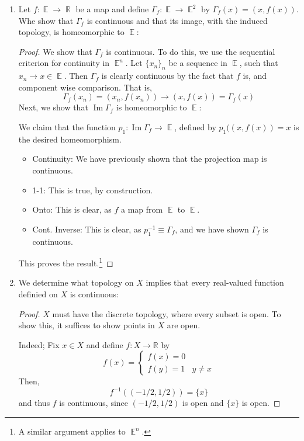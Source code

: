 \documentclass{book}
\DeclareMathOperator*{\R}{\mathbb{R}}
\DeclareMathOperator*{\E}{\mathbb{E}}
\DeclareMathOperator*{\Image}{\text{Im}}
\begin{document}
\begin{enumerate}[(1)]
    \item Let $f: \E \rightarrow \R$ be a map and define $\Gamma_f: \E \rightarrow \E^2$ by $\Gamma_f (x) = (x, f(x))$. Whe show that $\Gamma _f$ is continuous and that its image, with the induced topology, is homeomorphic to $\E$: 
        \begin{proof} We show that $\Gamma_f$ is continuous. To do this, we use the sequential criterion for continuity in $\E^n$. Let $\{x_n\}_n$ be a sequence in $\E$, such that $x_n \rightarrow x \in \E$. Then $\Gamma_f$ is clearly continuous by the fact that $f$ is, and component wise comparison.  That is, 
            \[  \Gamma_f (x_n) = (x_n, f(x_n)) \rightarrow (x, f(x)) = \Gamma_f (x) \]
            Next, we show that $\Image \Gamma_f$ is homeomorphic to $\E$:
            \par We claim that the function $p_1: \Image \Gamma_f \rightarrow \E$, defined by $p_1((x, f(x)) = x$ is the desired homeomorphism. 
            \begin{itemize}
                \item[] Continuity: We have previously shown that the projection map is continuous.
                \item[] 1-1: This is true, by construction. 
                \item[] Onto: This is clear, as $f$ a map from $\E$ to $\E$. 
                \item[] Cont. Inverse: This is clear, as $p_1^{-1} \equiv \Gamma_f$, and we have shown $\Gamma_f$ is continuous. 
            \end{itemize}
            This proves the result.\footnote{A similar argument applies to $\E^n$.} 
        \end{proof}

    \item We determine what topology on $X$ implies that every real-valued function definied on $X$ is continuous: 
        \begin{proof} $X$ must have the discrete topology, where every subset is open. To show this, it suffices to show points in $X$ are open. 
            \par Indeed; Fix $x\in X$ and define $f: X\rightarrow \mathbb R$ by
            \[f(x) =
            \begin{cases}
                f(x) = 0 & \\
                f(y) = 1 & y \neq x 
            \end{cases}
            \]
            Then,
            \[f^{-1}((-1/2,1/2))=\{x\}\] and thus $f$ is continuous, since $(-1/2,1/2)$ is open and $\{x\}$ is open.
        \end{proof}


\end{enumerate}
\end{document}
